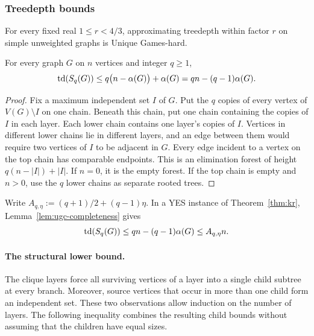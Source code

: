 \subsubsection{Treedepth bounds}

\begin{theorem}\label{thm:ugc-hardness}
For every fixed real $1\leq r<4/3$, approximating treedepth within
factor $r$ on simple unweighted graphs is Unique Games-hard.
\end{theorem}

\begin{lemma}\label{lem:ugc-completeness}
For every graph $G$ on $n$ vertices and integer $q\geq1$,
\[
  \operatorname{td}(S_q(G))\leq q\bigl(n-\alpha(G)\bigr)+\alpha(G)
  =qn-(q-1)\alpha(G).
\]
\end{lemma}

\begin{proof}
Fix a maximum independent set $I$ of $G$. Put the $q$ copies of every
vertex of $V(G)\setminus I$ on one chain. Beneath this chain, put one
chain containing the copies of $I$ in each layer. Each lower chain
contains one layer's copies of $I$. Vertices in different lower chains
lie in different layers, and an edge between them would require two
vertices of $I$ to be adjacent in $G$. Every edge incident to a vertex on the top chain
has comparable endpoints. This is an elimination forest of height
$q(n-|I|)+|I|$. If $n=0$, it is the empty forest. If the top chain
is empty and $n>0$, use the $q$ lower chains as separate rooted trees.
\end{proof}

Write $A_{q,\eta}:=(q+1)/2+(q-1)\eta$. In a YES instance of
Theorem~\ref{thm:kr}, Lemma~\ref{lem:ugc-completeness} gives
\begin{equation}\label{eq:ugc-yes}
 \operatorname{td}(S_q(G))\leq qn-(q-1)\alpha(G)
 \leq A_{q,\eta}n.
\end{equation}

\paragraph{The structural lower bound.}

The clique layers force all surviving vertices of a layer into a
single child subtree at every branch. Moreover, source vertices that
occur in more than one child form an independent set. These two
observations allow induction on the number of layers. The following
inequality combines the resulting child bounds without assuming that
the children have equal sizes.

